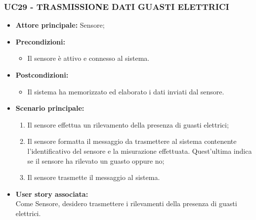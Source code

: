 \subsubsection{UC29 - TRASMISSIONE DATI GUASTI ELETTRICI}
\begin{itemize}
    \item \textbf{Attore principale:} Sensore;
    \item \textbf{Precondizioni:}
        \begin{itemize}
            \item Il sensore è attivo e connesso al sistema. 
        \end{itemize}
    \item \textbf{Postcondizioni:}
        \begin{itemize}
            \item Il sistema ha memorizzato ed elaborato i dati inviati dal sensore.
        \end{itemize}
    \item \textbf{Scenario principale:}
        \begin{enumerate}
            \item Il sensore effettua un rilevamento della presenza di guasti elettrici;
            \item Il sensore formatta il messaggio da trasmettere al sistema contenente l'identificativo del sensore e la misurazione effettuata. Quest'ultima indica se il sensore ha rilevato un guasto oppure no;
            \item Il sensore trasmette il messaggio al sistema.
        \end{enumerate}
    \item \textbf{User story associata:} \\
    Come Sensore, desidero trasmettere i rilevamenti della presenza di guasti elettrici.
\end{itemize}
